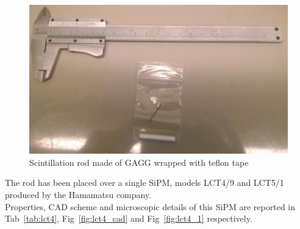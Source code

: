\documentclass[10pt,a4paper, openany]{book}
\begin{document}
\begin{figure}[!h]
\begin{center}
\includegraphics[scale=0.33]{imm/gagg1.jpg}
\end{center}
\caption{Scintillation rod made of GAGG wrapped with teflon tape}
\label{fig:gagg1}
\end{figure}

The rod has been placed over a single SiPM, models LCT4/9 and LCT5/1 produced by the Hamamatsu company.\\
Properties, CAD scheme and microscopic details of this SiPM are reported in Tab~\ref{tab:lct4}, Fig~\ref{fig:lct4_cad} and Fig~\ref{fig:lct4_1} respectively.
\end{document}
